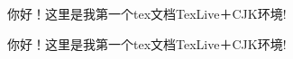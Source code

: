 \documentclass{article}
\begin{document}
\begin{CJK}{UTF8}{nsung}
你好！这里是我第一个tex文档TexLive＋CJK环境!
\end{CJK}

\begin{CJK}{UTF8}{nkai}
你好！这里是我第一个tex文档TexLive＋CJK环境!
\end{CJK}
\end{document}
